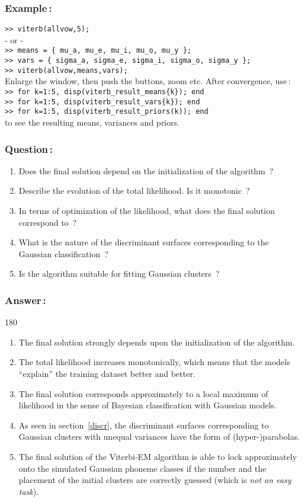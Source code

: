 \documentclass[twoside,a4paper,titlepage]{article}
\newcommand{\mat}[1]{{\tt >> #1} \\}
\newcommand{\expl}[1]{%
\begin{turn}{180}%
\parbox{\textwidth}{\em #1}%
\end{turn}%
}
\begin{document}
\subsubsection*{Example\,:}
\mat{viterb(allvow,5);}
- or - \\
\mat{means =  \{ mu\_a, mu\_e, mu\_i, mu\_o, mu\_y \};}
\mat{vars = \{ sigma\_a, sigma\_e, sigma\_i, sigma\_o, sigma\_y \};}
\mat{viterb(allvow,means,vars);}
Enlarge the window, then push the buttons, zoom etc.
After convergence, use\,:\\
\mat{for k=1:5, disp(viterb\_result\_means\{k\}); end}
\mat{for k=1:5, disp(viterb\_result\_vars\{k\}); end}
\mat{for k=1:5, disp(viterb\_result\_priors(k)); end}
to see the resulting means, variances and priors.


\subsubsection*{Question\,:}
\begin{enumerate}
\item Does the final solution depend on the initialization of the
algorithm~?
\item Describe the evolution of the total likelihood. Is it monotonic~?
\item In terms of optimization of the likelihood, what does the final
solution correspond to~?
\item What is the nature of the discriminant surfaces corresponding to the
Gaussian classification~?
\item Is the algorithm suitable for fitting Gaussian clusters~?
\end{enumerate}


\subsubsection*{Answer\,:}
\expl{
\begin{enumerate}
\item The final solution strongly depends upon the initialization of
the algorithm.
\item The total likelihood increases monotonically, which means that
the models ``explain'' the training dataset better and better.
\item The final solution corresponds approximately to a local maximum
of likelihood in the sense of Bayesian classification with Gaussian
models.
\item As seen in section~\ref{discr}, the discriminant surfaces
corresponding to Gaussian clusters with unequal variances have the form of
(hyper-)parabolas.
\item The final solution of the Viterbi-EM algorithm is able to lock
approximately onto the simulated Gaussian phoneme classes if the number and
the placement of the initial clusters are correctly guessed (which is {\em
not an easy task}).
\end{enumerate}
}
\end{document}
